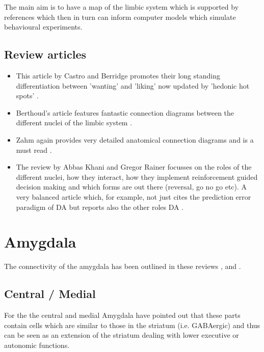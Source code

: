 \documentclass[12pt,a4paper]{article}
\begin{document}
The main aim is to have a map of the limbic system which is supported by references which then in turn can inform computer models which simulate behavioural experiments.




\subsection{Review articles}
\begin{itemize}
\item This article by Castro and Berridge promotes their long standing differentiation between 'wanting' and 'liking' \citep{Berridge2009} now updated by 'hedonic hot spots' \citep{Castro2015}.
\item Berthoud's article features fantastic connection diagrams between the different nuclei of the limbic system \citep{Berthoud04}.
\item Zahm again provides very detailed anatomical connection diagrams and is a must read \citep{Zahm00}.
\item The review by  Abbas Khani and Gregor Rainer focusses on the roles of the different nuclei, how they interact, how they implement reinforcement guided decision making and which forms are out there (reversal, go no go etc). A very balanced article which, for example, not just cites the prediction error paradigm of DA but reports also the other roles DA \citep{Khani2016}.
\end{itemize}










\section{Amygdala}

The connectivity of the amygdala has been outlined in these reviews \citep{Alheid2003}, \citep{Sah2003} and \citep{Swanson1998}.

\subsection{Central / Medial}

For the  the central and medial Amygdala \citep{Swanson2003}\citep{Swanson1998} have pointed out that these parts contain cells which are similar to those in the striatum (i.e. GABAergic) and thus can be seen as an extension of the striatum dealing with lower executive or autonomic functions.
\end{document}
